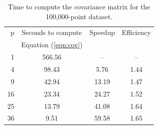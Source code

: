 \begin{table}
  \begin{center}
    \begin{tabular}{|r|c|c|c|}
      \hline
      p & Seconds to compute & Speedup & Efficiency \\
      & Equation (\ref{eqn:cov}) &  &  \\
      \hline
      1 & 566.56 & -- & -- \\
      4 & 98.43 & 5.76 & 1.44 \\
      9 & 42.94 & 13.19 & 1.47 \\
      16 & 23.34 & 24.27 & 1.52 \\
      25 & 13.79 & 41.08 & 1.64 \\
      36 & 9.51 & 59.58 & 1.65 \\
      \hline
    \end{tabular}
    \caption {{\small Time to compute the covariance matrix for the 100,000-point dataset.
      }}
    \label{tab:Kbig}
  \end{center}
\end{table}


